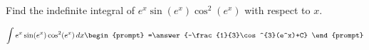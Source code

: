 \documentclass{ximera}
\author{Gregory Hartman \and Matthew Carr}
\begin{document}
\begin{exercise}

Find the indefinite integral of $e^x\sin(e^x)\cos^2(e^x)$ with respect to $x$.

\[
\int e^x\sin(e^x)\cos^2(e^x)\d x
\begin{prompt}
=\answer{-\frac{1}{3}\cos^{3}(e^x)+C}
\end{prompt}
\]


\end{exercise}
\end{document}
